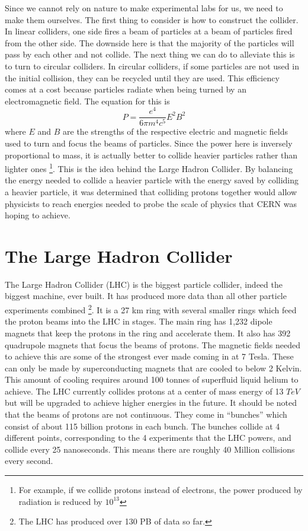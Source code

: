 Since we cannot rely on nature to make experimental labs for us, we need to make them ourselves.
The first thing to consider is how to construct the collider. In linear colliders, one side fires a beam of particles at a beam of particles fired from the other side.
The downside here is that the majority of the particles will pass by each other and not collide. The next thing we can do to alleviate this is to turn to circular colliders.
In circular colliders, if some particles are not used in the initial collision, they can be recycled until they are used.
This efficiency comes at a cost because particles radiate when being turned by an electromagnetic field. The equation for this is
\begin{equation}
    P = \frac{e^4}{6 \pi m^4 c^5} E^2 B^2
\end{equation}
where $E$ and $B$ are the strengths of the respective electric and magnetic fields used to turn and focus the beams of particles.
Since the power here is inversely proportional to mass, it is actually better to collide heavier particles rather than lighter ones \footnote{For example, if we collide protons instead of electrons, the power produced by radiation is reduced by $10^{13}$}. 
This is the idea behind the Large Hadron Collider. By balancing the energy needed to collide a heavier particle with the energy saved by colliding a heavier particle, it was determined that colliding protons together would allow physicists to reach energies needed to probe the scale of physics that CERN was hoping to achieve.

\section{The Large Hadron Collider}

The Large Hadron Collider (LHC) is the biggest particle collider, indeed the biggest machine, ever built.
It has produced more data than all other particle experiments combined \footnote{The LHC has produced over 130 PB of data so far.}.
It is a 27 km ring with several smaller rings which feed the proton beams into the LHC in stages.
The main ring has 1,232 dipole magnets that keep the protons in the ring and accelerate them.
It also has 392 quadrupole magnets that focus the beams of protons. The magnetic fields needed to achieve this are some of the strongest ever made coming in at 7 Tesla.
These can only be made by superconducting magnets that are cooled to below 2 Kelvin.
This amount of cooling requires around 100 tonnes of superfluid liquid helium to achieve.
The LHC currently collides protons at a center of mass energy of 13 $TeV$ but will be upgraded to achieve higher energies in the future.
It should be noted that the beams of protons are not continuous. They come in ``bunches'' which consist of about 115 billion protons in each bunch.
The bunches collide at 4 different points, corresponding to the 4 experiments that the LHC powers, and collide every 25 nanoseconds.
This means there are roughly 40 Million collisions every second. 

